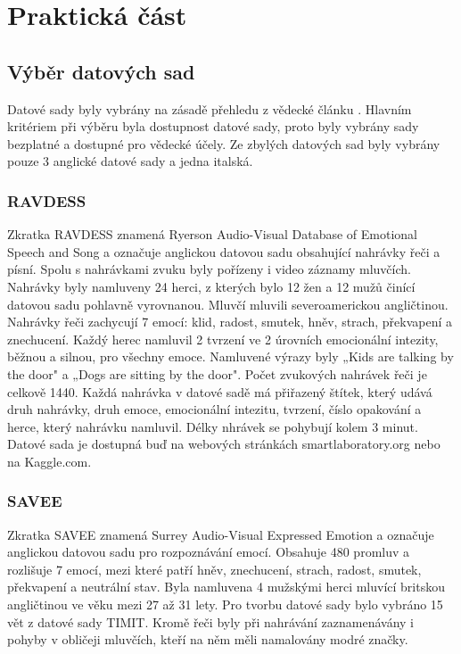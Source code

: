 \documentclass[FM,BP]{tulthesis}
\begin{document}
\chapter{Praktická část}
\section{Výběr datových sad}
Datové sady byly vybrány na zásadě přehledu z vědecké článku \cite{DBLP:journals/speech/AkcayO20}. Hlavním kritériem při výběru byla dostupnost datové sady, proto byly vybrány sady bezplatné a dostupné pro vědecké účely. Ze zbylých datových sad byly vybrány pouze 3 anglické datové sady a jedna italská.

\subsection{RAVDESS}
Zkratka RAVDESS znamená Ryerson Audio-Visual Database of Emotional Speech and Song a označuje anglickou datovou sadu obsahující nahrávky řeči a písní. Spolu s nahrávkami zvuku byly pořízeny i video záznamy mluvčích. Nahrávky byly namluveny 24 herci, z kterých bylo 12 žen a 12 mužů činící datovou sadu pohlavně vyrovnanou. Mluvčí mluvili severoamerickou angličtinou. Nahrávky řeči zachycují 7 emocí: klid, radost, smutek, hněv, strach, překvapení a znechucení. Každý herec namluvil 2 tvrzení ve 2 úrovních emocionální intezity, běžnou a silnou, pro všechny emoce. Namluvené výrazy byly „Kids are talking by the door" a „Dogs are sitting by the door". Počet zvukových nahrávek řeči je celkově 1440. Každá nahrávka v datové sadě má přiřazený štítek, který udává druh nahrávky, druh emoce, emocionální intezitu, tvrzení, číslo opakování a herce, který nahrávku namluvil. Délky nhrávek se pohybují kolem 3 minut. Datové sada je dostupná buď na webových stránkách smartlaboratory.org nebo na Kaggle.com.\cite{smart_lab}

\subsection{SAVEE}
Zkratka SAVEE znamená Surrey Audio-Visual Expressed Emotion a označuje anglickou datovou sadu pro rozpoznávání emocí. Obsahuje 480 promluv a rozlišuje 7 emocí, mezi které patří hněv, znechucení, strach, radost, smutek, překvapení a neutrální stav. Byla namluvena 4 mužskými herci mluvící britskou angličtinou ve věku mezi 27 až 31 lety. Pro tvorbu datové sady bylo vybráno 15 vět z datové sady TIMIT. Kromě řeči byly při nahrávání zaznamenávány i pohyby v obličeji mluvčích, kteří na něm měli namalovány modré značky.\cite{savee}
\end{document}
